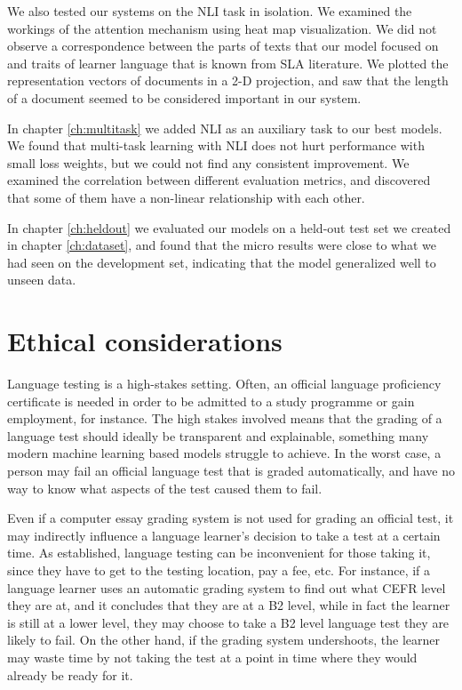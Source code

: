 We also tested our systems on the NLI task in isolation. We examined the
workings of the attention mechanism using heat map visualization. We did not
observe a correspondence between the parts of texts that our model focused on
and traits of learner language that is known from \ac{SLA} literature. We
plotted the representation vectors of documents in a 2-D projection, and saw
that the length of a document seemed to be considered important in our
system.

In chapter \ref{ch:multitask} we added \ac{NLI} as an auxiliary task to our
best models. We found that multi-task learning with NLI does not hurt
performance with small loss weights, but we could not find any consistent
improvement. We examined the correlation between different evaluation
metrics, and discovered that some of them have a non-linear relationship with
each other.

In chapter \ref{ch:heldout} we evaluated our models on a held-out test set we
created in chapter \ref{ch:dataset}, and found that the micro \FI results
were close to what we had seen on the development set, indicating that the
model generalized well to unseen data.


\section{Ethical considerations}

Language testing is a high-stakes setting. Often, an official language
proficiency certificate is needed in order to be admitted to a study
programme or gain employment, for instance. The high stakes involved means
that the grading of a language test should ideally be transparent and
explainable, something many modern machine learning based models struggle to
achieve. In the worst case, a person may fail an official language test that
is graded automatically, and have no way to know what aspects of the test
caused them to fail.

Even if a computer essay grading system is not used for grading an official
test, it may indirectly influence a language learner's decision to take a
test at a certain time. As established, language testing can be inconvenient
for those taking it, since they have to get to the testing location, pay a
fee, etc. For instance, if a language learner uses an automatic grading
system to find out what CEFR level they are at, and it concludes that they
are at a B2 level, while in fact the learner is still at a lower level, they
may choose to take a B2 level language test they are likely to fail. On the
other hand, if the grading system undershoots, the learner may waste time by
not taking the test at a point in time where they would already be ready for
it.

